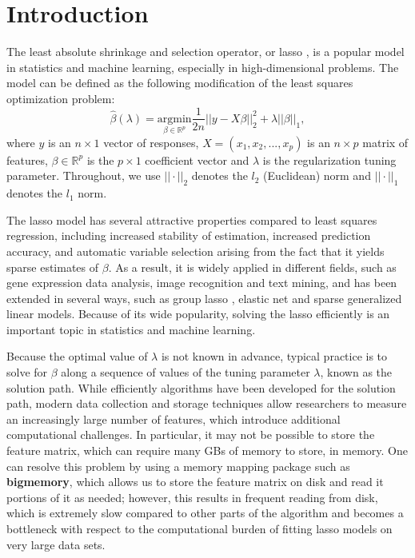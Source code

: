 \section{Introduction}

The least absolute shrinkage and selection operator, or lasso \citep{tibshirani1996regression}, is a popular model in statistics and machine learning, especially in high-dimensional problems. The model can be defined as the following modification of the least squares optimization problem:
\begin{equation}
    \hat{\beta}(\lambda)=\underset{\beta\in \mathbb{R}^p}{\mathrm{argmin}}\frac{1}{2n}||y-X\beta||_2^2+\lambda||\beta||_1,
\end{equation}
where $y$ is an $n\times 1$ vector of responses, $X=(x_1,x_2,...,x_p)$ is an $n\times p$ matrix of features, $\beta\in \mathbb{R}^p$ is the $p\times 1$ coefficient vector and $\lambda$ is the regularization tuning parameter. Throughout, we use $||\cdot||_2$ denotes the $l_2$ (Euclidean) norm and $||\cdot||_1$ denotes the $l_1$ norm. 

The lasso model has several attractive properties compared to least squares regression, including increased stability of estimation, increased prediction accuracy, and automatic variable selection arising from the fact that it yields sparse estimates of $\beta$.  As a result, it is widely applied in different fields, such as gene expression data analysis, image recognition and text mining, and has been extended in several ways, such as group lasso \citep{yuan2006model}, elastic net \citep{zou2005regularization} and sparse generalized linear models. Because of its wide popularity, solving the lasso efficiently is an important topic in statistics and machine learning.

Because the optimal value of $\lambda$ is not known in advance, typical practice is to solve for $\beta$ along a sequence of values of the tuning parameter $\lambda$, known as the solution path. While efficiently algorithms have been developed \citep{friedman2007pathwise} for the solution path, modern data collection and storage techniques allow researchers to measure an increasingly large number of features, which introduce additional computational challenges. In particular, it may not be possible to store the feature matrix, which can require many GBs of memory to store, in memory. One can resolve this problem by using a memory mapping package such as \textbf{bigmemory}, which allows us to store the feature matrix on disk and read it portions of it as needed; however, this results in frequent reading from disk, which is extremely slow compared to other parts of the algorithm and becomes a bottleneck with respect to the computational burden of fitting lasso models on very large data sets.

